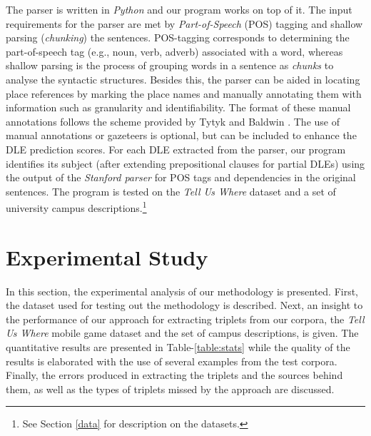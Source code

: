 \documentclass{sig-alternate}
\begin{document}
The parser is written in \textit{Python} and our program works on top of it. The input requirements for the parser are met by \textit{Part-of-Speech} (POS) tagging and shallow parsing (\textit{chunking}) the sentences. POS-tagging corresponds to determining the part-of-speech tag (e.g., noun, verb, adverb) associated with a word, whereas shallow parsing is the process of grouping words in a sentence as \textit{chunks} to analyse the syntactic structures. Besides this, the parser can be aided in locating place references by marking the place names and manually annotating them with information such as granularity and identifiability. The format of these manual annotations follows the scheme provided by Tytyk and Baldwin \cite{igor:annotations}. The use of manual annotations or gazeteers is optional, but can be included to enhance the DLE prediction scores. For each DLE extracted from the parser, our program identifies its subject (after extending prepositional clauses for partial DLEs) using the output of the \textit{Stanford parser} \cite{klein:accurate} for POS tags and dependencies in the original sentences. The program is tested on the \textit{Tell Us Where} dataset \cite{tuw} and a set of university campus descriptions.\footnote{See Section \ref{data} for description on the datasets.}
\section{Experimental Study}
\label{sec:experimentalstudy}
In this section, the experimental analysis of our methodology is presented. First, the dataset used for testing out the methodology is described. Next, an insight to the performance of our approach for extracting triplets from our corpora, the \textit{Tell Us Where} mobile game dataset and the set of campus descriptions, is given. The quantitative results are presented in Table-\ref{table:stats} while the quality of the results is elaborated with the use of several examples from the test corpora. Finally, the errors produced in extracting the triplets and the sources behind them, as well as the types of triplets missed by the approach are discussed.
\end{document}

